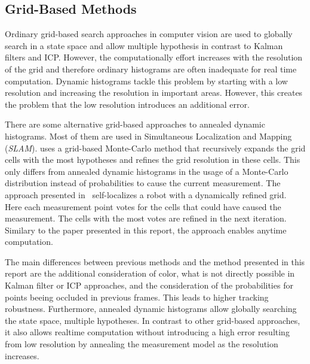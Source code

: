 \documentclass[twoside,a4paper,article]{combine}
\begin{document}
\subsection{Grid-Based Methods}
\label{sub:grid-based-methods}
Ordinary grid-based search approaches in computer vision are used to
globally search in a state space and allow multiple hypothesis in
contrast to Kalman filters and ICP. However, the computationally
effort increases with the resolution of the grid and therefore
ordinary histograms are often inadequate for real time computation.
Dynamic histograms tackle this problem by starting with a low
resolution and increasing the resolution in important areas. However,
this creates the problem that the low resolution introduces an
additional error.

There are some alternative grid-based approaches to annealed dynamic
histograms. Most of them are used in Simultaneous Localization and
Mapping (\textit{SLAM}). \cite{multi-res-grid-slam2} uses a grid-based
Monte-Carlo method that recursively expands the grid cells with the
most hypotheses and refines the grid resolution in these cells. This
only differs from annealed dynamic histograms in the usage of a
Monte-Carlo distribution instead of probabilities to cause the current
measurement. The approach presented in~\cite{multi-res-grid-slam}
self-localizes a robot with a dynamically refined grid. Here each
measurement point votes for the cells that could have caused the
measurement. The cells with the most votes are refined in the next
iteration. Similary to the paper presented in this report, the
approach enables anytime computation.

The main differences between previous methods and the method presented
in this report are the additional consideration of color, what is not
directly possible in Kalman filter or ICP approaches, and the
consideration of the probabilities for points beeing occluded in
previous frames. This leads to higher tracking
robustness. Furthermore, annealed dynamic histograms allow globally
searching the state space, multiple hypotheses. In contrast to other
grid-based approaches, it also allows realtime computation without
introducing a high error resulting from low resolution by
annealing the measurement model as the resolution increases.

\end{document}
